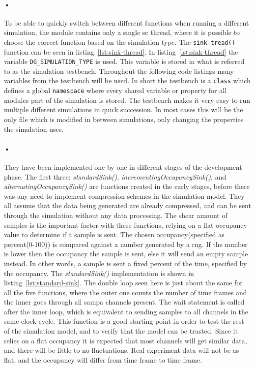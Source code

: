 \documentclass[a4paper, 12pt]{report}
\newcommand{\codeword}[1]{\texttt{#1}}
\begin{document}
\paragraph{•} 
To be able to quickly switch between different functions when running a different simulation, the module contains only a single \gls{sc} thread, where it is possible to choose the correct function based on the simulation type.
The \codeword{sink\_tread()} function can be seen in listing~\ref{lst:sink-thread}.
In listing~\ref{lst:sink-thread} the variable \codeword{DG\_SIMULATION\_TYPE} is used.
This variable is stored in what is referred to as the simulation testbench.
Throughout the following code listings many variables from the testbench will be used.
In short the testbench is a \codeword{class} which defines a global \codeword{namespace} where every shared variable or property for all modules part of the simulation is stored.
The testbench makes it very easy to run multiple different simulations in quick succession.
In most cases this will be the only file which is modified in between simulations, only changing the properties the simulation uses.

\begin{minipage}{\linewidth}

\end{minipage}

\paragraph{•}
They have been implemented one by one in different stages of the development phase.
The first three: \textit{standardSink()}, \textit{incrementingOccupancySink()}, and \textit{alternatingOccupancySink()} are functions created in the early stages, before there was any need to implement compression schemes in the simulation model.
They all assume that the data being generated are already compressed, and can be sent through the simulation without any data processing.
The shear amount of samples is the important factor with these functions, relying on a flat occupancy value to determine if a sample is sent.
The chosen occupancy(specified as percent(0-100)) is compared against a number generated by a \gls{rng}.
If the number is lower then the occupancy the sample is sent, else it will send an empty sample instead.
In other words, a sample is sent a fixed percent of the time, specified by the occupancy.
The \textit{standardSink()} implementation is shown in listing~\ref{lst:standard-sink}.
The double loop seen here is just about the same for all the five functions, where the outer one counts the number of time frames and the inner goes through all \gls{sampa} channels present.
The wait statement is called after the inner loop, which is equivalent to sending samples to all channels in the same clock cycle.
This function is a good starting point in order to test the rest of the simulation model, and to verify that the model can be trusted.
Since it relies on a flat occupancy it is expected that most channels will get similar data, and there will be little to no fluctuations.
Real experiment data will not be as flat, and the occupancy will differ from time frame to time frame.
\end{document}
